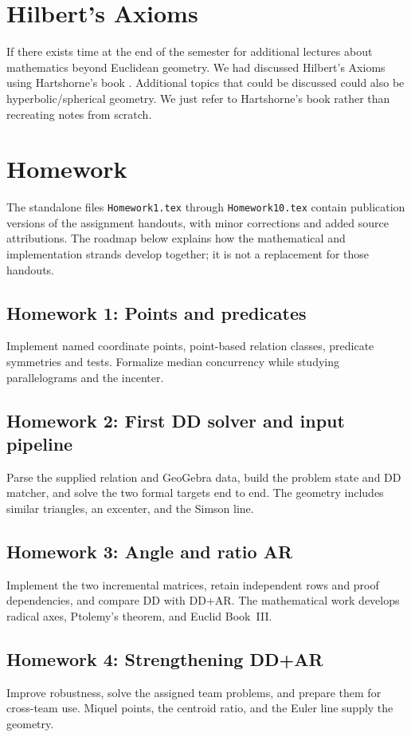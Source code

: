 \documentclass[reqno]{amsart}
\DeclareMathOperator{\1}{\textbf{1}}
\begin{document}
\section{Hilbert's Axioms}
If there exists time at the end of the semester for additional lectures about
mathematics beyond Euclidean geometry. We had discussed Hilbert's Axioms using
Hartshorne's book \cite{hartshorne2013geometry}. Additional topics that could be
discussed could also be hyperbolic/spherical geometry. We just refer to
Hartshorne's book rather than recreating notes from scratch.

\section{Homework}
The standalone files \texttt{Homework1.tex} through \texttt{Homework10.tex}
contain publication versions of the assignment handouts, with minor
corrections and added source attributions. The roadmap below explains how the
mathematical and implementation strands develop together; it is not a
replacement for those handouts.

\subsection{Homework 1: Points and predicates}
Implement named coordinate points, point-based relation classes, predicate
symmetries and tests. Formalize median concurrency while studying
parallelograms and the incenter.

\subsection{Homework 2: First DD solver and input pipeline}
Parse the supplied relation and GeoGebra data, build the problem state and DD
matcher, and solve the two formal targets end to end. The geometry includes
similar triangles, an excenter, and the Simson line.

\subsection{Homework 3: Angle and ratio AR}
Implement the two incremental matrices, retain independent rows and proof
dependencies, and compare DD with DD+AR. The mathematical work develops
radical axes, Ptolemy's theorem, and Euclid Book~III.

\subsection{Homework 4: Strengthening DD+AR}
Improve robustness, solve the assigned team problems, and prepare them for
cross-team use. Miquel points, the centroid ratio, and the Euler line supply
the geometry.
\end{document}
